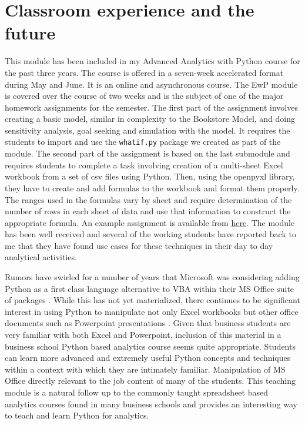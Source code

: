 \documentclass[ited,blindrev]{informs3}              %
\newcommand{\code}[1]{\texttt{#1}}
\begin{document}

\section{Classroom experience and the future}

This module has been included in my Advanced Analytics with Python course for the past three years. The course is offered in a seven-week accelerated format during May and June. It is an online and asynchronous course. The EwP module is covered over the course of two weeks and is the subject of one of the major homework assignments for the semester. The first part of the assignment involves creating a basic model, similar in complexity to the Bookstore Model, and doing sensitivity analysis, goal seeking and simulation with the model. It requires the students to import and use the \code{whatif.py} package we created as part of the module. The second part of the assignment is based on the last submodule and requires  students to complete a task involving creation of a multi-sheet Excel workbook from a set of csv files using Python. Then, using the openpyxl library, they have to create and add formulas to the workbook and format them properly. The ranges used in the formulas vary by sheet and require determination of the number of rows in each sheet of data and use that information to construct the appropriate formula. An example assignment is available from \href{some.url}{here}. The module has been well received and several of the working students have reported back to me that they have found use cases for these techniques in their day to day analytical activities.

Rumors have swirled for a number of years that Microsoft was considering adding Python as a first class language alternative to VBA within their MS Office suite of packages \cite{bibid}. While this has not yet materialized, there continues to be significant interest in using Python to manipulate not only Excel workbooks but other office documents such as Powerpoint presentations \cite{bibid}. Given that business students are very familiar with both Excel and Powerpoint, inclusion of this material in a business school Python based analytics course seems quite appropriate. Students can learn more advanced and extremely useful Python concepts and techniques within a context with which they are intimately familiar. Manipulation of MS Office directly relevant to the job content of many of the students. This teaching module is a natural follow up to the commonly taught spreadsheet based analytics courses found in many business schools and provides an interesting way to teach and learn Python for analytics.
\end{document}
